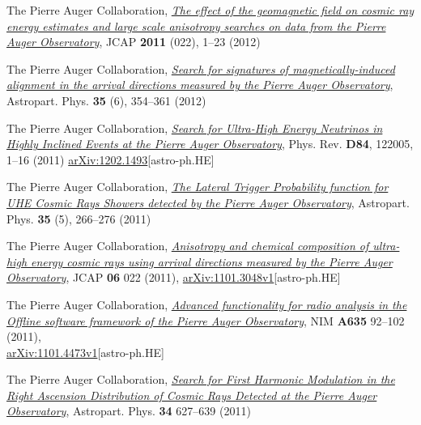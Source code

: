 \begin{etaremune}
\item {}The Pierre Auger Collaboration, 
\href{http://dx.doi.org/10.1088/1475-7516/2011/11/022}{\emph{The effect of the
geomagnetic field on cosmic ray energy estimates and large scale anisotropy
searches on data from the Pierre Auger Observatory}}, JCAP {\bf{2011}} (022),
1--23 (2012)

\item {}The Pierre Auger Collaboration, 
\href{http://dx.doi.org/10.1016/j.astropartphys.2011.10.004}{\emph{Search for
signatures of magnetically-induced alignment in the arrival directions measured
by the Pierre Auger Observatory}}, Astropart. Phys. {\bf{35}} (6), 354--361
(2012)

\item {}The Pierre Auger Collaboration,
\href{http://dx.doi.org/10.1016/10.1103/PhysRevD.84.122005}{\emph{Search for
Ultra-High Energy Neutrinos in Highly Inclined Events at the Pierre Auger
Observatory}}, Phys.  Rev. {\bf D84}, 122005, 1--16 (2011)
\href{http://arxiv.org/abs/1202.1493}{arXiv:1202.1493}[astro-ph.HE]

\item {}The Pierre Auger Collaboration, 
\href{http://dx.doi.org/10.1016/j.astropartphys.2011.08.001}{\emph{The Lateral
Trigger Probability function for UHE Cosmic Rays Showers detected by the Pierre
Auger Observatory}}, Astropart. Phys. {\bf{35}} (5), 266--276 (2011)

\item {}The Pierre Auger Collaboration,
\href{http://dx.doi.org/10.1088/1475-7516/2011/06/022}{\emph{Anisotropy and
chemical composition of ultra-high energy cosmic rays using arrival directions
measured by the Pierre Auger Observatory}}, JCAP {\bf 06} 022 (2011),
\href{http://arxiv.org/abs/1106.3048}{arXiv:1101.3048v1}[astro-ph.HE]

\item {}The Pierre Auger Collaboration,
\href{http://dx.doi.org/10.1016/j.nima.2011.01.049}{{\emph{Advanced
functionality for radio analysis in the Offline software framework of the
Pierre Auger Observatory}}}, NIM {\bf A635} 92--102
(2011),\\
\href{http://arxiv.org/abs/1101.4473}{arXiv:1101.4473v1}[astro-ph.HE]

\item {}The Pierre Auger Collaboration,
\href{http://dx.doi.org/10.1016/j.astropartphys.2010.12.007}{\emph{Search for
First Harmonic Modulation in the Right Ascension Distribution of Cosmic Rays
Detected at the Pierre Auger Observatory}}, Astropart. Phys. {\bf 34} 627--639
(2011)


\end{etaremune}
